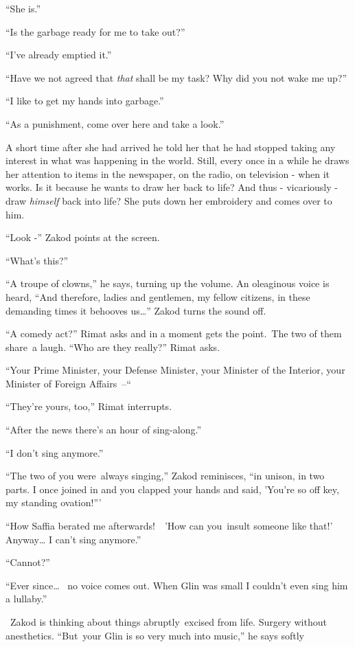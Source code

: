 \documentclass[twoside,11pt]{book}
\begin{document}
``She is.'' 

``Is the garbage ready for me to take out?'' 

``I've already emptied it.'' 

``Have we not agreed that \textit{that} shall be my task? Why did you not wake me up?'' 

``I like to get my hands into garbage.'' 

``As a punishment, come over here and take a look.''

A short time after she had arrived he told her that he had stopped taking any interest in what was happening in the
world. Still, every once in a while he draws her attention to items in the newspaper, on the radio, on television -
when it works. Is it because he wants to draw her back to life? And thus - vicariously - draw \textit{himself} back
into life? She puts down her embroidery and comes over to him. 

``Look -'' Zakod points at the screen. 

``What's this?'' 

``A troupe of clowns,'' he says, turning up the volume. An oleaginous voice is heard,
``And therefore, ladies and gentlemen, my fellow citizens, in these demanding times it behooves
us{\dots}'' Zakod turns the sound off. \ 

``A comedy act?'' Rimat asks and in a moment gets the point.~The two of them share~a laugh.
``Who are they really?'' Rimat asks. 

``Your Prime Minister, your Defense Minister, your Minister of the Interior, your Minister of Foreign
Affairs\ {}--``

``They're yours, too,'' Rimat interrupts.

``After the news there's an hour of sing-along.'' 

``I don't sing anymore.'' 

``The two of you were~always singing,'' Zakod reminisces, ``in unison, in two
parts. I once joined in and you clapped your hands and said, 'You're so off key, my standing ovation!''' 

``How Saffia berated me afterwards!\ \ {}'How can you~insult someone like that!' Anyway{\dots} I can't sing
anymore.'' 

``Cannot?'' 

``Ever since{\dots} ~no voice comes out. When Glin was small I couldn't even sing him a
lullaby.'' 

~Zakod is thinking about things abruptly~excised from life. Surgery without anesthetics. ``But~your Glin is
so very much into music,'' he says softly
\end{document}
